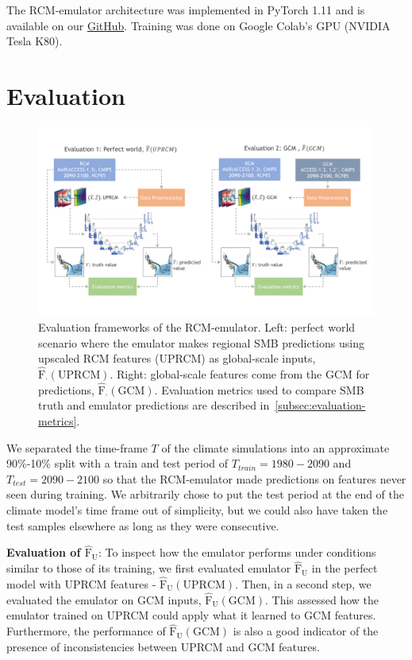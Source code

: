 \documentclass[a4paper,11pt,oneside]{report}
\begin{document}
The RCM-emulator architecture was implemented in PyTorch 1.11 and is available on our \href{https://github.com/marvande/master-thesis}{GitHub}. Training was done on Google Colab's GPU (NVIDIA Tesla K80).

\section{Evaluation}\label{sec:evaluation}

\begin{figure}[!t]
  \centering
  \includegraphics[width=\columnwidth]{doc/Thesis-latex/images/evaluation_framework.pdf}
  \caption []{\small Evaluation frameworks of the RCM-emulator. Left: perfect world scenario where the emulator makes regional SMB predictions using upscaled RCM features (UPRCM) as global-scale inputs, $\mathrm{\hat{F}_{\cdot}(UPRCM)}$. Right: global-scale features come from the GCM for predictions, $\mathrm{\hat{F}_{\cdot}(GCM)}$. Evaluation metrics used to compare SMB truth and emulator predictions are described in~\autoref{subsec:evaluation-metrics}.}
  \vspace{-3mm}
  \label{fig:evaluation-framework}
\end{figure}

We separated the time-frame $T$ of the climate simulations into an approximate 90\%-10\% split with a train and test period of $T_{train} = 1980-2090$ and $T_{test} = 2090-2100$ so that the RCM-emulator made predictions on features never seen during training. We arbitrarily chose to put the test period at the end of the climate model's time frame out of simplicity, but we could also have taken the test samples elsewhere as long as they were consecutive. 

\textbf{Evaluation of $\mathrm{\hat{F}_U}$}: To inspect how the emulator performs under conditions similar to those of its training, we first evaluated emulator $\mathrm{\hat{F}_U}$ in the perfect model with UPRCM features - $\mathrm{\hat{F}_U(UPRCM)}$. Then, in a second step, we evaluated the emulator on GCM inputs, $\mathrm{\hat{F}_U(GCM)}$. This assessed how the emulator trained on UPRCM could apply what it learned to GCM features. Furthermore, the performance of $\mathrm{\hat{F}_U(GCM)}$ is also a good indicator of the presence of inconsistencies between UPRCM and GCM features. 
\end{document}
